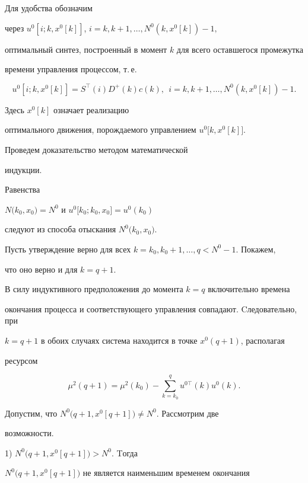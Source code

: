 \begin{pf}


Для удобства обозначим


через $u^0[i;k,x^0[k]]$, $i=k,k+1,\dotsc,N^0(k,x^0[k])-1,$


оптимальный синтез, построенный в момент $k$ для всего оставшегося промежутка


времени управления процессом, т.\,е.


$$


u^0[i;k,x^0[k]]=S^{\top}(i)D^+(k)c(k),\ \


i=k,k+1,\dotsc,N^0(k,x^0[k])-1.


$$


Здесь $x^0[k]$ означает реализацию


оптимального движения, порождаемого управлением $u^0\bigl[k,x^0[k]\bigr]$.


Проведем доказательство методом математической


индукции.





Равенства


$N\bigl(k_0, x_0\bigr)=N^0$ и $u^0\bigl[k_0; k_0, x_0\bigr]=u^0(k_0)$


следуют из способа отыскания $N^0\bigl(k_0, x_0\bigr)$.


Пусть утверждение верно для всех $k=k_0, k_0+1,\dotsc, q<N^0-1$. Покажем,


что оно верно и для $k=q+1$.





В силу индуктивного предположения до момента $k=q$ включительно времена


окончания процесса и соответствующего управления совпадают. Cледовательно, при


$k=q+1$ в обоих случаях система находится в точке $x^0(q+1)$, располагая


ресурсом


$$


\mu^2(q+1)=\mu^2(k_0)-\sum_{k=k_0}^{q} u^{0 \top}(k) u^0(k).


$$


Допустим, что $N^0\bigl(q+1, x^0[q+1]\bigr)\neq N^0$. Рассмотрим две


возможности.





1) $N^0\bigl(q+1, x^0[q+1]\bigr)> N^0$. Tогда


$N^0\bigl(q+1, x^0[q+1]\bigr)$ не является наименьшим временем окончания



\end{pf}
